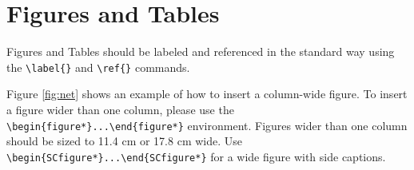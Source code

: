 \documentclass[9pt,twocolumn,twoside]{ilcss}
\begin{document}
\section{Figures and Tables}

Figures and Tables should be labeled and referenced in the standard way using the \verb|\label{}| and \verb|\ref{}| commands.




Figure \ref{fig:net} shows an example of how to insert a column-wide figure. To insert a figure wider than one column, please use the \verb|\begin{figure*}...\end{figure*}| environment. Figures wider than one column should be sized to 11.4 cm or 17.8 cm wide. Use \verb|\begin{SCfigure*}...\end{SCfigure*}| for a wide figure with side captions.
\end{document}
